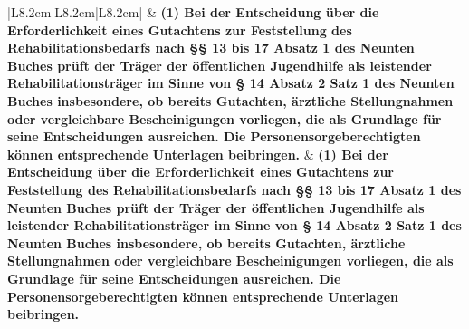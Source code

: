 \documentclass[10pt,a4paper,landscape]{article}
\begin{document}
\begin{longtable}{|L{8.2cm}|L{8.2cm}|L{8.2cm}|}
 & \textbf{(1) Bei der Entscheidung über die  \newline Erforderlichkeit eines Gutachtens zur  \newline Feststellung des Rehabilitationsbedarfs  \newline nach \S{}\S{} 13 bis 17 Absatz 1 des Neunten  \newline Buches prüft der Träger der öffentlichen  \newline Jugendhilfe als leistender  \newline Rehabilitationsträger im Sinne von \S{} 14  \newline Absatz 2 Satz 1 des Neunten Buches  \newline insbesondere, ob bereits Gutachten,  \newline ärztliche Stellungnahmen oder  \newline vergleichbare Bescheinigungen  \newline vorliegen, die als Grundlage für seine  \newline Entscheidungen ausreichen. Die  \newline Personensorgeberechtigten können  \newline entsprechende Unterlagen beibringen. } & \textbf{(1) Bei der Entscheidung über die  \newline Erforderlichkeit eines Gutachtens zur  \newline Feststellung des Rehabilitationsbedarfs  \newline nach \S{}\S{} 13 bis 17 Absatz 1 des Neunten  \newline Buches prüft der Träger der öffentlichen  \newline Jugendhilfe als leistender  \newline Rehabilitationsträger im Sinne von \S{} 14  \newline Absatz 2 Satz 1 des Neunten Buches  \newline insbesondere, ob bereits Gutachten,  \newline ärztliche Stellungnahmen oder  \newline vergleichbare Bescheinigungen  \newline vorliegen, die als Grundlage für seine  \newline Entscheidungen ausreichen. Die  \newline Personensorgeberechtigten können  \newline entsprechende Unterlagen beibringen. } \\
\hhline{|---|}

\end{longtable}
\end{document}
